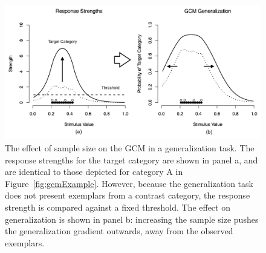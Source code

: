 \documentclass[doc,apacite]{apa6}
\begin{document}




\begin{figure}[t]
\begin{center}
\includegraphics[scale=.35]{figures/GCM-gen.png}
\caption{The effect of sample size on the GCM in a generalization task. The response strengths for the target category are shown in panel a, and are identical to those depicted for category A in Figure~\protect\ref{fig:gcmExample}. However, because the generalization task does not present exemplars from a contrast category, the response strength is compared against a fixed threshold. The effect on generalization is shown in panel b: increasing the sample size pushes the generalization gradient outwards, away from the observed exemplars.}
\label{fig:gcmExample2}
\end{center}
\end{figure}
\end{document}
